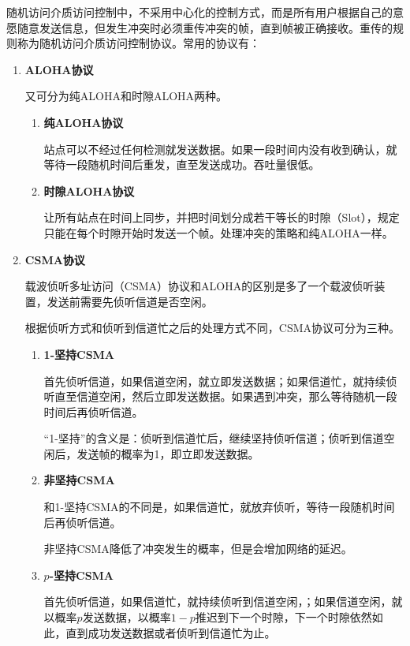 \documentclass[12pt, a4paper, oneside]{ctexart}
\begin{document}
随机访问介质访问控制中，不采用中心化的控制方式，而是所有用户根据自己的意愿随意发送信息，但发生冲突时必须重传冲突的帧，直到帧被正确接收。重传的规则称为随机访问介质访问控制协议。常用的协议有：
\begin{enumerate}
    \item {\bf ALOHA协议}
    
    又可分为纯ALOHA和时隙ALOHA两种。
    \begin{enumerate}
        \item {\bf 纯ALOHA协议}
        
        站点可以不经过任何检测就发送数据。如果一段时间内没有收到确认，就等待一段随机时间后重发，直至发送成功。吞吐量很低。
        \item {\bf 时隙ALOHA协议}
        
        让所有站点在时间上同步，并把时间划分成若干等长的时隙（Slot），规定只能在每个时隙开始时发送一个帧。处理冲突的策略和纯ALOHA一样。
    \end{enumerate}
    \item {\bf CSMA协议}
    
    载波侦听多址访问（CSMA）协议和ALOHA的区别是多了一个载波侦听装置，发送前需要先侦听信道是否空闲。

    根据侦听方式和侦听到信道忙之后的处理方式不同，CSMA协议可分为三种。
    \begin{enumerate}
        \item {\bf 1-坚持CSMA}
        
        首先侦听信道，如果信道空闲，就立即发送数据；如果信道忙，就持续侦听直至信道空闲，然后立即发送数据。如果遇到冲突，那么等待随机一段时间后再侦听信道。

        “1-坚持”的含义是：侦听到信道忙后，继续坚持侦听信道；侦听到信道空闲后，发送帧的概率为1，即立即发送数据。
        \item {\bf 非坚持CSMA}
        
        和1-坚持CSMA的不同是，如果信道忙，就放弃侦听，等待一段随机时间后再侦听信道。

        非坚持CSMA降低了冲突发生的概率，但是会增加网络的延迟。
        \item {\bf $p$-坚持CSMA}
        
        首先侦听信道，如果信道忙，就持续侦听到信道空闲，；如果信道空闲，就以概率$p$发送数据，以概率$1-p$推迟到下一个时隙，下一个时隙依然如此，直到成功发送数据或者侦听到信道忙为止。


\end{enumerate}
\end{enumerate}
\end{document}
